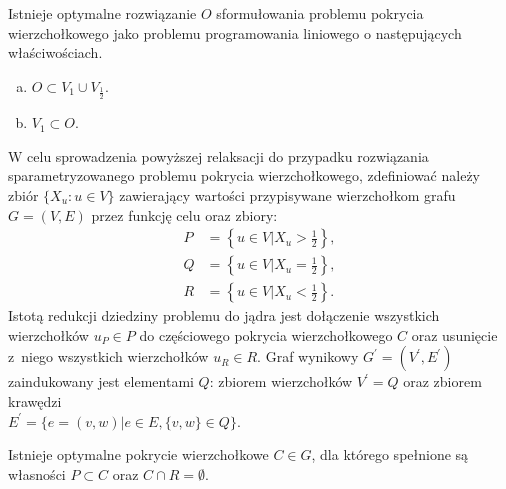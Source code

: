 \begin{theorem}
  Istnieje optymalne rozwiązanie $O$ sformułowania problemu pokrycia wierzchołkowego jako problemu programowania liniowego o następujących właściwościach.
  \begin{enumerate}[(a)]
    \item $O \subset V_1 \cup V_{\frac{1}{2}}$.
    \item $V_1 \subset O$.
  \end{enumerate}
\end{theorem}
W celu sprowadzenia powyższej relaksacji do przypadku rozwiązania
sparametryzowanego problemu pokrycia wierzchołkowego, zdefiniować należy zbiór 
$\{ X_u : u \in V \}$ zawierający wartości przypisywane wierzchołkom grafu 
$G=(V,E)$ przez funkcję celu oraz zbiory:\\
\begin{align*}
P&=\left\{u \in V | X_u>\frac{1}{2}\right\},\\
Q&=\left\{u \in V | X_u=\frac{1}{2}\right\},\\
R&=\left\{u \in V | X_u<\frac{1}{2}\right\}.
\end{align*}
Istotą redukcji dziedziny problemu do jądra jest dołączenie wszystkich
wierzchołków $u_P \in P$ do częściowego pokrycia wierzchołkowego $C$ oraz 
usunięcie z~niego wszystkich wierzchołków $u_R \in R$.
Graf wynikowy $G^\prime=(V^\prime, E^\prime)$ zaindukowany jest elementami $Q$: 
zbiorem wierzchołków $V^\prime=Q$ oraz zbiorem krawędzi\\$E^\prime=\{e=(v, w)| e \in E, \{v, w\} \in Q\}$.
\begin{theorem}
  Istnieje optymalne pokrycie wierzchołkowe $C \in G$, dla którego spełnione są własności $P \subset C$ oraz $C \cap R = \emptyset$.
\end{theorem}
